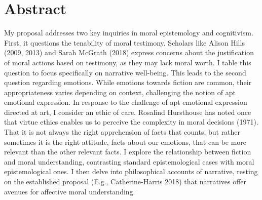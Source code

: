 \documentclass[phdthesis,12pt,final]{wuthesis}
\theoremstyle{definition}
\theoremstyle{definition}
\theoremstyle{definition}
\theoremstyle{definition}
\theoremstyle{remark}
\begin{document}
%
\cleardoublepage
{}
{}
\chapter*{Abstract}
\begin{doublespace}
My proposal addresses two key inquiries in moral epistemology and cognitivism. First, it questions the tenability of moral testimony. Scholars like Alison Hills (2009, 2013) and Sarah McGrath (2018) express concerns about the justification of moral actions based on testimony, as they may lack moral worth. I table this question to focus specifically on narrative well-being. This leads to the second question regarding emotions. While emotions towards fiction are common, their appropriateness varies depending on context, challenging the notion of apt emotional expression. In response to the challenge of apt emotional expression directed at art, I consider an ethic of care. Rosalind Hursthouse has noted once that virtue ethics enables us to perceive the complexity in moral decisions (1971). That it is not always the right apprehension of facts that counts, but rather sometimes it is the right attitude, facts about our emotions, that can be more relevant than the other relevant facts. I explore the relationship between fiction and moral understanding, contrasting standard epistemological cases with moral epistemological ones. I then delve into philosophical accounts of narrative, resting on the established proposal (E.g., Catherine-Harris 2018) that narratives offer avenues for affective moral understanding.
\end{doublespace}
\end{document}
